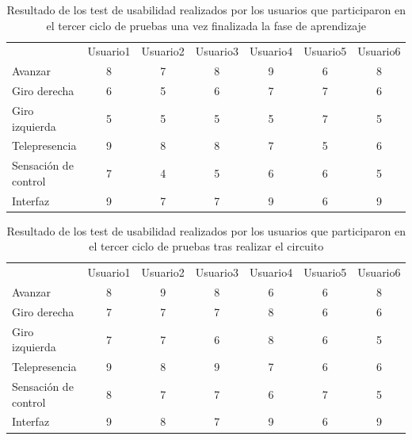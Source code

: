 \documentclass[twoside, 11pt]{epstfg}
\begin{document}
\begin{center}
	
	\begin{table}[h!]
		\small	
		
		\begin{tabular}{|g c c c c c c|}
			\hline
			 \\ \hline
			& Usuario1	&Usuario2	&Usuario3	&Usuario4	&Usuario5	&Usuario6 \\
			Avanzar
			& 8 &7 &8 &9 &6 & 8\\
			Giro derecha
			& 6 & 5 &6 &7 & 7& 6\\
			Giro izquierda
			& 5 & 5&5 &5 &7 & 5\\
			Telepresencia
			& 9 & 8 &8 & 7& 5& 6\\ 
			Sensación de control
			& 7 &4 &5 & 6&6 & 5\\
			Interfaz
			& 9 &7 & 7& 9& 6& 9\\
			\hline
		\end{tabular}
		\caption{Resultado de los test de usabilidad realizados por los usuarios que participaron en el tercer ciclo de pruebas una vez finalizada la fase de aprendizaje}
		\label{tabla3ciclo}
	\end{table}
\end{center}

\begin{center}
	\begin{table}[h!]
		\small
		
		\begin{tabular}{|g c c c c c c|}
			\hline
			 \\ \hline
			& Usuario1	&Usuario2	&Usuario3	&Usuario4	&Usuario5	&Usuario6 \\
			Avanzar
			& 8 &9 &8 &6 &6 & 8\\
			Giro derecha
			& 7 & 7 &7 &8 & 6& 6\\
			Giro izquierda
			& 7 & 7&6 &8 &6 & 5\\
			Telepresencia
			& 9 & 8 &9 & 7& 6& 6\\ 
			Sensación de control
			& 8 &7 &7 & 6&7 & 5\\
			Interfaz
			& 9 &8 & 7& 9& 6& 9\\
			\hline
		\end{tabular}
		
		\caption{Resultado de los test de usabilidad realizados por los usuarios que participaron en el tercer ciclo de pruebas tras realizar el circuito}
		\label{tabla23ciclo}
	\end{table}
\end{center}
\end{document}

